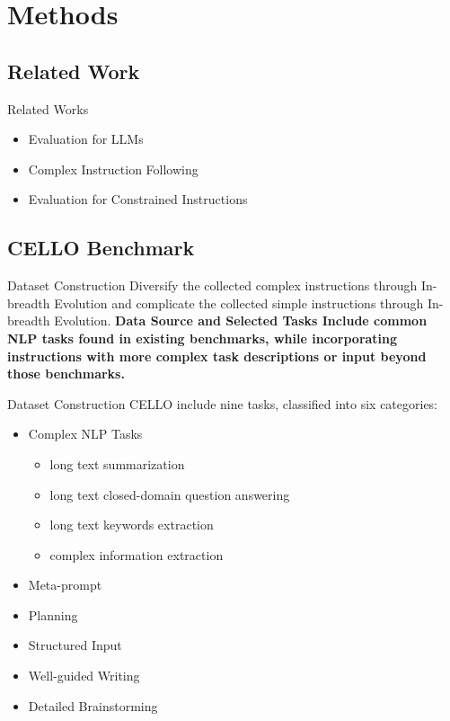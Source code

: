 \documentclass{beamer}
\begin{document}
\section{Methods}

\subsection{Related Work}

\begin{frame}{Related Works}
    \begin{itemize}
        \item {Evaluation for LLMs}
        \item {Complex Instruction Following}
        \item {Evaluation for Constrained Instructions}
    \end{itemize}
\end{frame}

\subsection{CELLO Benchmark}

\begin{frame}{Dataset Construction}
    Diversify the collected complex instructions through In-breadth Evolution and complicate the collected simple instructions through In-breadth Evolution.
    \newline
    \large\bfseries{Data Source and Selected Tasks}
    \newline
    \normalfont
    Include common NLP tasks found in existing benchmarks, while incorporating instructions with more complex task descriptions or input beyond those benchmarks.
\end{frame}

\begin{frame}{Dataset Construction}
    CELLO include nine tasks, classified into six categories:
    \begin{itemize}
        \item {Complex NLP Tasks}
            \begin{itemize}
                \item {long text summarization}
                \item {long text closed-domain question answering}
                \item {long text keywords extraction}
                \item {complex information extraction}
            \end{itemize}
        \item {Meta-prompt}
        \item {Planning}
        \item {Structured Input}
        \item {Well-guided Writing}
        \item {Detailed Brainstorming}
    \end{itemize}
\end{frame}
\end{document}
